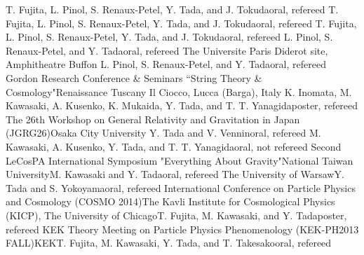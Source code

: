 \documentclass[11pt,a4paper,sans]{moderncv}
\begin{document}
{T. Fujita, L. Pinol, S. Renaux-Petel, Y. Tada, and J. Tokuda}{oral, refereed}
{T. Fujita, L. Pinol, S. Renaux-Petel, Y. Tada, and J. Tokuda}{oral, refereed}
{T. Fujita, L. Pinol, S. Renaux-Petel, Y. Tada, and J. Tokuda}{oral, refereed}
{L. Pinol, S. Renaux-Petel, and Y. Tada}{oral, refereed}
{The Universite Paris Diderot site, Amphitheatre Buffon}
{L. Pinol, S. Renaux-Petel, and Y. Tada}{oral, refereed}
{Gordon Research Conference \& Seminars ``String Theory \& Cosmology"}{Renaissance Tuscany Il Ciocco, Lucca (Barga), Italy}
{K. Inomata, M. Kawasaki, A. Kusenko, K. Mukaida, Y. Tada, and T. T. Yanagida}{poster, refereed}
{The 26th Workshop on General Relativity and Gravitation in Japan (JGRG26)}{Osaka City University}
{Y. Tada and V. Vennin}{oral, refereed}
{M. Kawasaki, A. Kusenko, Y. Tada, and T. T. Yanagida}{oral, not refereed}
{Second LeCosPA International Symposium "Everything About Gravity"}{National Taiwan University}{M. Kawasaki and Y. Tada}{oral, refereed}
{The University of Warsaw}{Y. Tada and S. Yokoyama}{oral, refereed}
{International Conference on Particle Physics and Cosmology (COSMO 2014)}{The Kavli Institute for Cosmological Physics (KICP), The University of Chicago}{T. Fujita, M. Kawasaki, and Y. Tada}{poster, refereed}
{KEK Theory Meeting on Particle Physics Phenomenology (KEK-PH2013 FALL)}{KEK}{T. Fujita, M. Kawasaki, Y. Tada, and T. Takesako}{oral, refereed}
\end{document}
